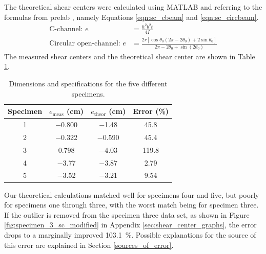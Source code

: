 \documentclass[12 pt]{report}
\begin{document}
The theoretical shear centers were calculated using MATLAB and referring to the formulas from prelab \cite{prelab_instructions}, namely Equations \ref{eqn:sc_cbeam} and \ref{eqn:sc_circbeam}.
\begin{align}
	\text{C-channel: }e&=\frac{h^2b^2t}{4I}\label{eqn:sc_cbeam}\\
	\text{Circular open-channel: }e&=\frac{2r[\cos\theta_0(2\pi-2\theta_0)+2\sin\theta_0]}{2\pi-2\theta_0+\sin(2\theta_0)}\label{eqn:sc_circbeam}
\end{align}
The measured shear centers and the theoretical shear center are shown in Table \ref{tbl:shear_centers}.

\begin{table}[!htbp]
\caption{Dimensions and specifications for the five different specimens.}
\begin{center}
	\begin{tabular}{|c|c|c|c|}
		\hline
		Specimen&$e_\text{meas}$ (\unit{cm})&$e_\text{theor}$  (\unit{cm})&Error (\unit{\percent})\\
		\hline
		1&\num{-0.800}&\num{-1.48}&\num{45.8}\\
		\hline
		2&\num{-0.322}&\num{-0.590}&\num{45.4}\\
		\hline
		3&\num{0.798}&\num{-4.03}&\num{119.8}\\
		\hline
		4&\num{-3.77}&\num{-3.87}&\num{2.79}\\
		\hline
		5&\num{-3.52}&\num{-3.21}&\num{9.54}\\
		\hline
	\end{tabular}
\end{center}
\label{tbl:shear_centers}
\end{table}

Our theoretical calculations matched well for specimens four and five, but poorly for specimens one through three, with the worst match being for specimen three. If the outlier is removed from the specimen three data set, as shown in Figure \ref{fig:specimen_3_sc_modified} in Appendix \ref{sec:shear_center_graphs}, the error drops to a marginally improved \qty{103.1}{\percent}. Possible explanations for the source of this error are explained in Section \ref{sources_of_error}.
\end{document}
